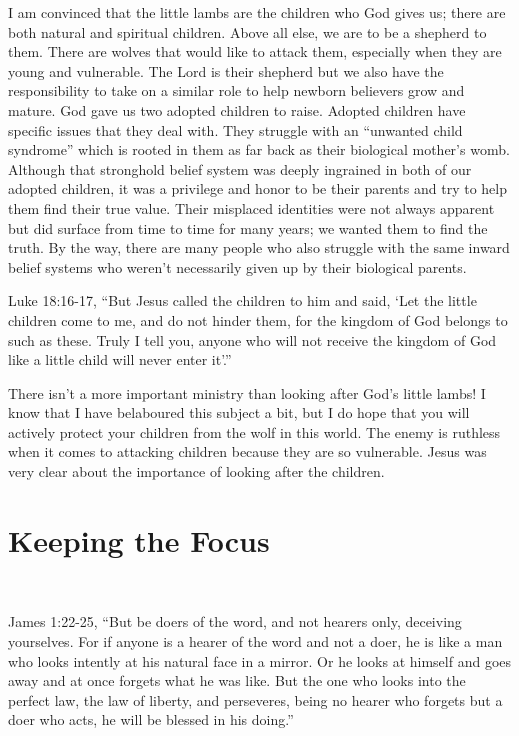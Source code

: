 \documentclass[oneside]{book}
\begin{document}
I am convinced that the little lambs are the children who God gives us; there are both natural and spiritual children. Above all else, we are to be a shepherd to them. There are wolves that would like to attack them, especially when they are young and vulnerable. The Lord is their shepherd but we also have the responsibility to take on a similar role to help newborn believers grow and mature. God gave us two adopted children to raise. Adopted children have specific issues that they deal with. They struggle with an “unwanted child syndrome” which is rooted in them as far back as their biological mother's womb. Although that stronghold belief system was deeply ingrained in both of our adopted children, it was a privilege and honor to be their parents and try to help them find their true value. Their misplaced identities were not always apparent but did surface from time to time for many years; we wanted them to find the truth. By the way, there are many people who also struggle with the same inward belief systems who weren't necessarily given up by their biological parents.

Luke 18:16-17, “But Jesus called the children to him and said, ‘Let the little children come to me, and do not hinder them, for the kingdom of God belongs to such as these. Truly I tell you, anyone who will not receive the kingdom of God like a little child will never enter it’.”  

There isn’t a more important ministry than looking after God’s little lambs! I know that I have belaboured this subject a bit, but I do hope that you will actively protect your children from the wolf in this world. The enemy is ruthless when it comes to attacking children because they are so vulnerable. Jesus was very clear about the importance of looking after the children.


\chapter{Keeping the Focus}
\

James 1:22-25, “But be doers of the word, and not hearers only, deceiving yourselves. For if anyone is a hearer of the word and not a doer, he is like a man who looks intently at his natural face in a mirror. Or he looks at himself and goes away and at once forgets what he was like. But the one who looks into the perfect law, the law of liberty, and perseveres, being no hearer who forgets but a doer who acts, he will be blessed in his doing.”
\end{document}
